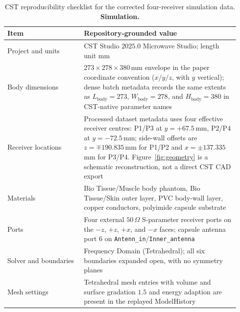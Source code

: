 \begin{table}[t]
\centering
\caption{CST reproducibility checklist for the corrected four-receiver simulation data. \textbf{Simulation.}}
\label{tab:cst-repro}
\scriptsize
\setlength{\tabcolsep}{3pt}
\begin{tabular}{@{}p{0.31\linewidth}>{\raggedright\arraybackslash}p{0.63\linewidth}@{}}
\toprule
Item & Repository-grounded value \\
\midrule
Project and units & CST Studio $2025.0$ Microwave Studio; length unit mm \\ %
Body dimensions & $273\times278\times380$\,mm envelope in the paper coordinate convention ($x/y/z$, with $y$ vertical); dense batch metadata records the same extents as $L_{\mathrm{body}}=273$, $W_{\mathrm{body}}=278$, and $H_{\mathrm{body}}=380$ in CST-native parameter names \\ %
Receiver locations & Processed dataset metadata uses four effective receiver centres: P1/P3 at $y={+}67.5$\,mm, P2/P4 at $y={-}72.5$\,mm; side-wall offsets are $z={\mp}190.835$\,mm for P1/P2 and $x={\pm}137.335$\,mm for P3/P4. Figure~\ref{fig:geometry} is a schematic reconstruction, not a direct CST CAD export \\ %
Materials & Bio Tissue/Muscle body phantom, Bio Tissue/Skin outer layer, PVC body-wall layer, copper conductors, polyimide capsule substrate \\ %
Ports & Four external $50\,\Omega$ S-parameter receiver ports on the $-z$, $+z$, $+x$, and $-x$ faces; capsule antenna port $6$ on \texttt{Antenn\_in}/\texttt{Inner\_antenna} \\ %
Solver and boundaries & Frequency Domain (Tetrahedral); all six boundaries expanded open, with no symmetry planes \\ %
	Mesh settings & Tetrahedral mesh entries with volume and surface gradation $1.5$ and energy adaption are present in the replayed ModelHistory \\ %

\end{tabular}
\end{table}
